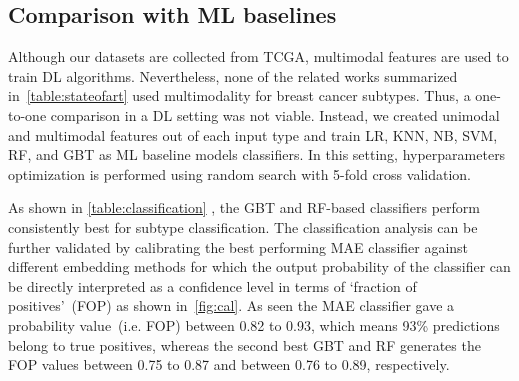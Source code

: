 \subsection{Comparison with ML baselines}
Although our datasets are collected from TCGA, multimodal features are used to train DL algorithms. Nevertheless, none of the related works summarized in~\cref{table:stateofart} used multimodality for breast cancer subtypes. 
Thus, a one-to-one comparison in a DL setting was not viable. Instead, we created unimodal and multimodal features out of each input type and train LR, KNN, NB, SVM, RF, and GBT as ML baseline models classifiers. 
In this setting, hyperparameters optimization is performed using random search with 5-fold cross validation. 

\hspace*{3.5mm} As shown in \cref{table:classification} 
, the GBT and RF-based classifiers 
perform consistently best for subtype classification. %
The classification analysis can be further validated by calibrating the best performing MAE classifier against different embedding methods for which the output probability of the classifier can be directly interpreted as a confidence level in terms of `fraction of positives'~(FOP) as shown in~\cref{fig:cal}. As seen the MAE classifier gave a probability value~(i.e. FOP) between 0.82 to 0.93, which means 93\% predictions belong to true positives, whereas the second best GBT and RF generates the FOP values between 0.75 to 0.87 and between 0.76 to 0.89, respectively. 


